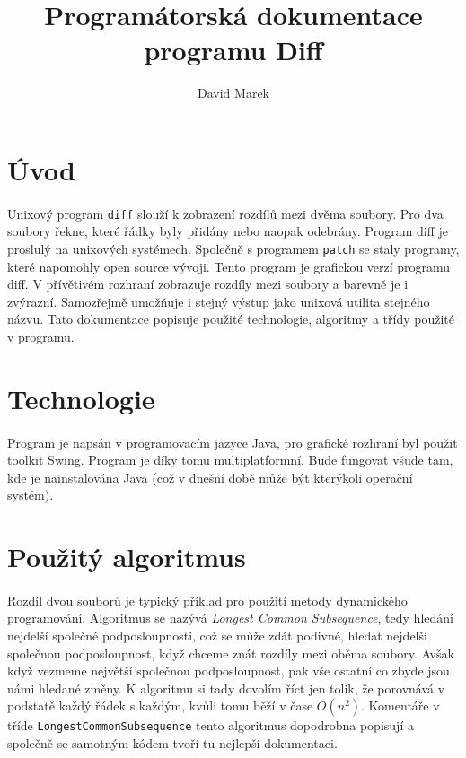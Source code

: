 \documentclass[11pt]{article}
\begin{document}
\author{David Marek}
\title{Programátorská dokumentace programu Diff}
\date{}
\maketitle{}

\newpage{}

\section{Úvod}

\paragraph{}
Unixový program {\tt diff} slouží k zobrazení rozdílů mezi dvěma soubory. 
Pro dva soubory řekne, které řádky byly přidány nebo naopak odebrány.
Program diff je proslulý na unixových systémech. Společně s 
programem {\tt patch} se staly programy, které napomohly open source vývoji.
Tento program je grafickou verzí programu diff. V přívětivém rozhraní
zobrazuje rozdíly mezi soubory a barevně je i zvýrazní. Samozřejmě umožňuje
i stejný výstup jako unixová utilita stejného názvu.
Tato dokumentace popisuje použité technologie, algoritmy a třídy použité v 
programu.

\section{Technologie}
            
\paragraph{}
Program je napsán v programovacím jazyce Java, pro grafické rozhraní byl použit
toolkit Swing. Program je díky tomu multiplatformní. Bude fungovat všude tam, 
kde je nainstalována Java (což v dnešní době může být kterýkoli operační 
systém).

\section{Použitý algoritmus}

\paragraph{}
Rozdíl dvou souborů je typický příklad pro použití metody dynamického 
programování. Algoritmus se nazývá \emph{Longest Common Subsequence}, tedy 
hledání nejdelší společné podposloupnosti, což se může zdát podivné, hledat
nejdelší společnou podposloupnost, když chceme znát rozdíly mezi oběma soubory.
Avšak když vezmeme největší společnou podposloupnost, pak vše ostatní co zbyde
jsou námi hledané změny. K algoritmu si tady dovolím říct jen tolik, že 
porovnává v podstatě každý řádek s každým, kvůli tomu běží v čase $O(n^2)$.
Komentáře v tříde {\tt LongestCommonSubsequence} tento algoritmus dopodrobna
popisují a společně se samotným kódem tvoří tu nejlepší dokumentaci. 
\end{document}
